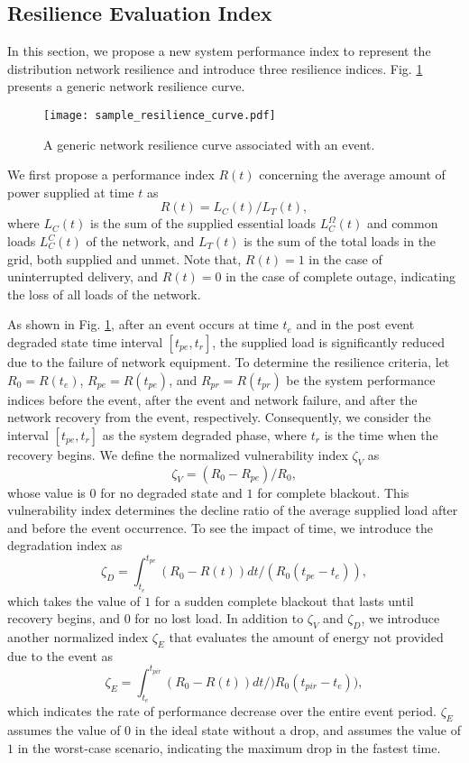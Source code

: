 \documentclass[conference]{IEEEtran}
\begin{document}
\subsection{Resilience Evaluation Index}\label{Sec_evaluation}
In this section, we propose a new system performance index to represent the distribution network resilience and introduce three resilience indices. Fig. \ref{resilience curve} presents a generic network resilience curve. \begin{figure}[!htb]
  \texttt{[image: sample\_resilience\_curve.pdf]}
  \caption{A generic network resilience curve associated with an event.}
  \label{resilience curve}
\end{figure}
We first propose a performance index $R(t)$ concerning the average amount of power supplied at time $t$ as
\begin{equation}\label{performance index}
    R(t)={L_C(t)}/{L_T(t)},
\end{equation}
where $L_C(t)$ is the sum of the supplied essential loads $L_C^{\Omega}(t)$ and common loads $L_C^C(t)$ of the network, and $L_T(t)$ is the sum of the total loads in the grid, both supplied and unmet. Note that, $R(t)=1$ in the case of uninterrupted delivery, and $R(t)=0$ in the case of complete outage, indicating the loss of all loads of the network.

As shown in  Fig. \ref{resilience curve}, after an event occurs at time $t_e$ and in the post event degraded state time interval $[t_{pe},t_r]$, the supplied load is significantly reduced due to the failure of network equipment.
To determine the resilience criteria, let $R_0=R(t_e)$, $R_{pe}=R(t_{pe})$, and $R_{pr}=R(t_{pr})$ be the system performance indices before the event, after the event and network failure, and after the network recovery from the event, respectively. Consequently, we consider the interval $[t_{pe},t_r]$ as the system degraded phase, where $t_r$ is the time when the recovery begins. We define the normalized vulnerability index $\zeta_V$ as
\begin{equation}\label{VI}
    \zeta_V=({R_0-R_{pe}})/{R_0},
\end{equation}
whose value is $0$ for no degraded state and $1$ for complete blackout. This vulnerability index determines the decline ratio of the average supplied load after and before the event occurrence.
To see the impact of time, we introduce the degradation index as
\begin{equation}\label{DI}
    \zeta_D={\int_{t_e}^{t_{pe}}(R_0-R(t))dt}/({R_0 (t_{pe}-t_e)}),
\end{equation}
which takes the value of $1$ for a sudden complete blackout that lasts until recovery begins, and $0$ for no lost load. 
In addition to $\zeta_V$ and $\zeta_D$, we introduce another normalized index $\zeta_E$ that evaluates the amount of energy not provided due to the event as
\begin{equation}\label{UEI}
    \zeta_E={\int_{t_e}^{t_{pir}}(R_0-R(t))dt}/){R_0 (t_{pir}-t_e)}),
\end{equation}
which indicates the rate of performance decrease over the entire event period. $\zeta_E$ assumes the value of $0$ in the ideal state without a drop, and assumes the value of $1$ in the worst-case scenario, indicating the maximum drop in the fastest time.
\end{document}

